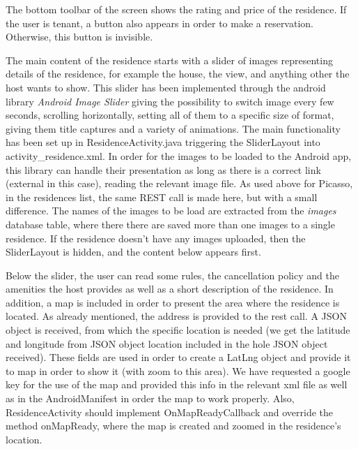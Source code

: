 \documentclass[12pt]{article}
\begin{document}
	The bottom toolbar of the screen shows the rating and price of the residence. If the user is tenant, a button also appears in order to make a reservation. Otherwise, this button is invisible.
	
	The main content of the residence starts with a slider of images representing details of the residence, for example the house, the view, and anything other the host wants to show. This slider has been implemented through the android library \textit{Android Image Slider} giving the possibility to switch image every few seconds, scrolling horizontally, setting all of them to a specific size of format, giving them title captures and a variety of animations. The main functionality has been set up in ResidenceActivity.java triggering the SliderLayout into activity\_residence.xml. In order for the images to be loaded to the Android app, this library can handle their presentation as long as there is a correct link (external in this case), reading the relevant image file. As used above for Picasso, in the residences list, the same REST call is made here, but with a small difference. The names of the images to be load are extracted from the \textit{images} database table, where there there are saved more than one images to a single residence. If the residence doesn't have any images uploaded, then the SliderLayout is hidden, and the content below appears first.
	
	Below the slider, the user can read some rules, the cancellation policy and the amenities the host provides as well as a short description of the residence. In addition, a map is included in order to present the area where the residence is located. As already mentioned, the address is provided to the rest call. A JSON object is received, from which the specific location is needed (we get the latitude and longitude from JSON object location included in the hole JSON object received). These fields are used in order to create a LatLng object and provide it to map in order to show it (with zoom to this area). We have requested a google key for the use of the map and provided this info in the relevant xml file as well as in the AndroidManifest in order the map to work properly. Also, ResidenceActivity should implement OnMapReadyCallback and override the method onMapReady, where the map is created and zoomed in the residence's location.
	
\end{document}
